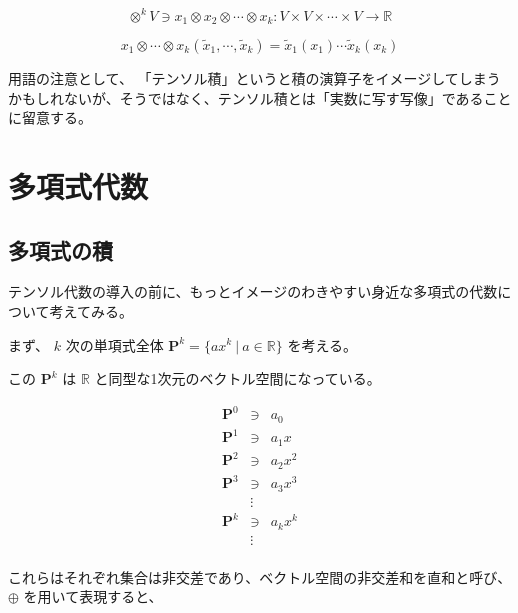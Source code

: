 \documentclass[uplatex,a4j,12pt,dvipdfmx]{jsarticle}
\begin{document}
$$ \otimes^{k} V \ni x_{1} \otimes x_{2} \otimes \cdots \otimes x_{k}: V \times V \times \cdots \times V \to \mathbb{R}$$

$$
	x_{1} \otimes \cdots \otimes x_{k} ( \tilde{x}_{1} , \cdots, \tilde{x}_{k})
	=
	\tilde{x}_{1} (x_{1}) \cdots \tilde{x}_{k} (x_{k})
$$

用語の注意として、
「テンソル積」というと積の演算子をイメージしてしまうかもしれないが、そうではなく、テンソル積とは「実数に写す写像」であることに留意する。

\section{多項式代数}

\subsection{多項式の積}

テンソル代数の導入の前に、もっとイメージのわきやすい身近な多項式の代数について考えてみる。

まず、 $k$ 次の単項式全体 $\mathbf{P}^{k} = \{ ax^{k} \ | \ a \in \mathbb{R} \}$ を考える。

この $\mathbf{P}^{k}$ は $\mathbb{R}$ と同型な1次元のベクトル空間になっている。

\[
	\begin{array}{rcl}
		\mathbf{P}^{0} & \ni    & a_{0}       \\
		\mathbf{P}^{1} & \ni    & a_{1} x     \\
		\mathbf{P}^{2} & \ni    & a_{2} x^{2} \\
		\mathbf{P}^{3} & \ni    & a_{3} x^{3} \\
		               & \vdots &             \\
		\mathbf{P}^{k} & \ni    & a_{k} x^{k} \\
		               & \vdots &             \\
	\end{array}
\]

これらはそれぞれ集合は非交差であり、ベクトル空間の非交差和を直和と呼び、$\oplus$ を用いて表現すると、
\end{document}
